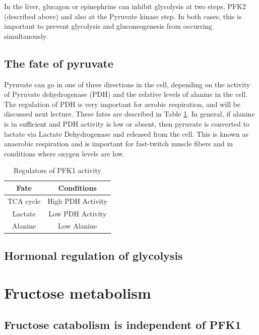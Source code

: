 \documentclass{tufte-handout}
\begin{document}
  In the liver, glucagon or epinephrine can inhibit glycolysis at two steps, PFK2 (described above) and also at the Pyruvate kinase step.  In both cases, this is important to prevent glycolysis and gluconeogenesis from occurring simultanously.

\subsection{The fate of pyruvate}

Pyruvate can go in one of three directions in the cell, depending on the activity of Pyruvate dehydrogenase (PDH) and the relative levels of alanine in the cell.  The regulation of PDH is very important for aerobic respiration, and will be discussed next lecture.  These fates are described in Table \ref{tab:pyruvate-fates}.  In general, if alanine is in sufficient and PDH activity is low or absent, then pyruvate is converted to lactate via Lactate Dehydrogenase and released from the cell.  This is known as anaerobic respiration and is important for fast-twitch muscle fibers and in conditions where oxygen levels are low.

\begin{table}
\centering
\caption{Regulators of PFK1 activity}
\label{tab:pyruvate-fates}
\begin{tabular}{cc}
\hline
\textbf {Fate} & \textbf{Conditions}  \\
\hline
TCA cycle & High PDH Activity \\
Lactate & Low PDH Activity \\
Alanine & Low Alanine \\
\hline
\end{tabular}
\end{table}

\subsection{Hormonal regulation of glycolysis}

\section{Fructose metabolism}
\subsection{Fructose catabolism is independent of PFK1}
\end{document}
